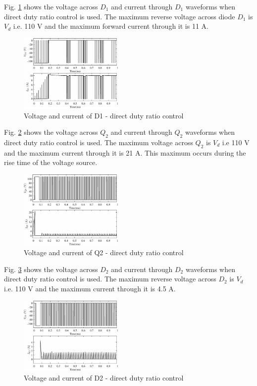 \documentclass[a4paper]{IEEEtran}
\begin{document}
	Fig. \ref{fig:sim-d1} shows the voltage across $D_1$ and current through $D_1$ waveforms when direct duty ratio control is used. The maximum reverse voltage across diode $D_1$ is $V_d$ i.e. 110 V and the maximum forward current through it is 11 A.

	\begin{figure}
		\centering
		\includegraphics[width=0.45\textwidth]{D1}
		\caption{Voltage and current of D1 - direct duty ratio control}
		\label{fig:sim-d1}
	\end{figure}

	Fig. \ref{fig:sim-q2} shows the voltage across $Q_2$ and current through $Q_2$ waveforms when direct duty ratio control is used. The maximum voltage across $Q_2$ is $V_d$ i.e 110 V and the maximum current through it is 21 A. This maximum occurs during the rise time of the voltage source.

	\begin{figure}
		\centering
		\includegraphics[width=0.45\textwidth]{Q2}
		\caption{Voltage and current of Q2 - direct duty ratio control}
		\label{fig:sim-q2}
	\end{figure}

	Fig. \ref{fig:sim-d2} shows the voltage across $D_2$ and current through $D_2$ waveforms when direct duty ratio control is used. The maximum reverse voltage across $D_2$ is $V_d$ i.e. 110 V and the maximum current through it is 4.5 A.

	\begin{figure}
		\centering
		\includegraphics[width=0.45\textwidth]{D2}
		\caption{Voltage and current of D2 - direct duty ratio control}
		\label{fig:sim-d2}
	\end{figure}
\end{document}
